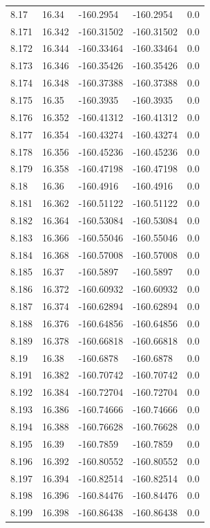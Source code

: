 \begin{tabular}{lllll}
8.17 & 16.34 & -160.2954 & -160.2954 & 0.0 \\
8.171 & 16.342 & -160.31502 & -160.31502 & 0.0 \\
8.172 & 16.344 & -160.33464 & -160.33464 & 0.0 \\
8.173 & 16.346 & -160.35426 & -160.35426 & 0.0 \\
8.174 & 16.348 & -160.37388 & -160.37388 & 0.0 \\
8.175 & 16.35 & -160.3935 & -160.3935 & 0.0 \\
8.176 & 16.352 & -160.41312 & -160.41312 & 0.0 \\
8.177 & 16.354 & -160.43274 & -160.43274 & 0.0 \\
8.178 & 16.356 & -160.45236 & -160.45236 & 0.0 \\
8.179 & 16.358 & -160.47198 & -160.47198 & 0.0 \\
8.18 & 16.36 & -160.4916 & -160.4916 & 0.0 \\
8.181 & 16.362 & -160.51122 & -160.51122 & 0.0 \\
8.182 & 16.364 & -160.53084 & -160.53084 & 0.0 \\
8.183 & 16.366 & -160.55046 & -160.55046 & 0.0 \\
8.184 & 16.368 & -160.57008 & -160.57008 & 0.0 \\
8.185 & 16.37 & -160.5897 & -160.5897 & 0.0 \\
8.186 & 16.372 & -160.60932 & -160.60932 & 0.0 \\
8.187 & 16.374 & -160.62894 & -160.62894 & 0.0 \\
8.188 & 16.376 & -160.64856 & -160.64856 & 0.0 \\
8.189 & 16.378 & -160.66818 & -160.66818 & 0.0 \\
8.19 & 16.38 & -160.6878 & -160.6878 & 0.0 \\
8.191 & 16.382 & -160.70742 & -160.70742 & 0.0 \\
8.192 & 16.384 & -160.72704 & -160.72704 & 0.0 \\
8.193 & 16.386 & -160.74666 & -160.74666 & 0.0 \\
8.194 & 16.388 & -160.76628 & -160.76628 & 0.0 \\
8.195 & 16.39 & -160.7859 & -160.7859 & 0.0 \\
8.196 & 16.392 & -160.80552 & -160.80552 & 0.0 \\
8.197 & 16.394 & -160.82514 & -160.82514 & 0.0 \\
8.198 & 16.396 & -160.84476 & -160.84476 & 0.0 \\
8.199 & 16.398 & -160.86438 & -160.86438 & 0.0 \\

\end{tabular}
